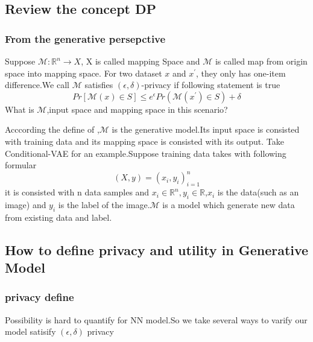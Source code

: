 \documentclass{beamer}
\newcommand{\R}{\mathbb{R}}
\begin{document}
\subsection{Review the concept DP}
\begin{frame}
  \frametitle{From the generative persepctive}
    Suppose $\mathcal{M}:\R^n\to X$,
    X is called mapping Space and $\mathcal M$
     is called map from origin space into mapping space.
     For two dataset $x$ and $x^\prime$, they only has one-item difference.We call $\mathcal M$ satisfies $(\epsilon,\delta)$-privacy if following statement is true
     \begin{equation}
      Pr[\mathcal{M}(x)\in S] \leq e^{\epsilon}  Pr(\mathcal M(x^\prime )\in  S) +\delta
     \end{equation}
     What is $\mathcal M$,input space and mapping space in this scenario?
\end{frame}
\begin{frame}
  Acccording the define of \cite{ref1},$\mathcal{M}$ is the generative model.Its input space is consisted with training data and its mapping space is consisted with its output.
  Take Conditional-VAE for an example.Suppose training data takes with following formular
  \begin{equation}
    (X,y) = {(x_i,y_i)}_{i=1}^n
  \end{equation}
  it is consisted with n data samples and $x_i\in \R^n,y_i\in \R$,$x_i$ is the data(such as an image) and $y_i$ is the label of the image.$\mathcal M$ is a model which generate new data from existing data and label.

\end{frame}
\subsection{How to define privacy and utility in Generative Model}
\begin{frame}
    \frametitle{privacy define}
    Possibility is hard to quantify for NN model.So we take several ways to varify our model satisify $(\epsilon,\delta)$ privacy
\end{frame}
\end{document}
